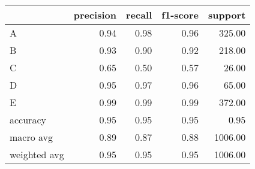 \begin{tabular}{|l|r|r|r|r|}
\hline
{} &  precision &  recall &  f1-score &  support \\
\hline
A            &       0.94 &    0.98 &      0.96 &   325.00 \\
B            &       0.93 &    0.90 &      0.92 &   218.00 \\
C            &       0.65 &    0.50 &      0.57 &    26.00 \\
D            &       0.95 &    0.97 &      0.96 &    65.00 \\
E            &       0.99 &    0.99 &      0.99 &   372.00 \\
accuracy     &       0.95 &    0.95 &      0.95 &     0.95 \\
macro avg    &       0.89 &    0.87 &      0.88 &  1006.00 \\
weighted avg &       0.95 &    0.95 &      0.95 &  1006.00 \\
\hline
\end{tabular}
